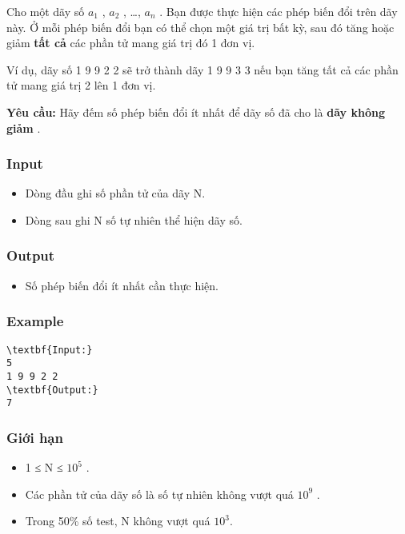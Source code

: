 

Cho một dãy số $a_{1}$ , $a_{2}$ , …, $a_{n}$ . Bạn được thực hiện các phép biến đổi trên dãy này. Ở mỗi phép biến đổi bạn có thể chọn một giá trị bất kỳ, sau đó tăng hoặc giảm \textbf{ tất cả } các phần tử mang giá trị đó 1 đơn vị.

Ví dụ, dãy số 1 9 9 2 2 sẽ trở thành dãy 1 9 9 3 3 nếu bạn tăng tất cả các phần tử mang giá trị 2 lên 1 đơn vị.

\textbf{Yêu cầu: } Hãy đếm số phép biến đổi ít nhất để dãy số đã cho là \textbf{ dãy không giảm } .

\subsubsection{Input}
\begin{itemize}
	\item Dòng đầu ghi số phần tử của dãy N.
	\item Dòng sau ghi N số tự nhiên thể hiện dãy số.
\end{itemize}

\subsubsection{Output}
\begin{itemize}
	\item Số phép biến đổi ít nhất cần thực hiện.
\end{itemize}

\subsubsection{Example}
\begin{verbatim}
\textbf{Input:}
5
1 9 9 2 2
\textbf{Output:}
7\end{verbatim}

\subsubsection{Giới hạn}
\begin{itemize}
	\item 1 ≤ N ≤ $10^{5}$ .
	\item Các phần tử của dãy số là số tự nhiên không vượt quá $10^{9}$ .
	\item Trong 50\% số test, N không vượt quá $10^{3}$.
\end{itemize}
